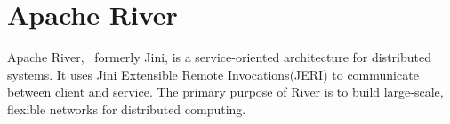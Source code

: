 \section{Apache River}

Apache River,~\cite{hid-sp18-www-526-apache-river} formerly
Jini, is a service-oriented architecture for distributed
systems. It uses Jini Extensible Remote Invocations(JERI)
to communicate between client and service. The primary 
purpose of River is to build large-scale, flexible networks
for distributed computing.

